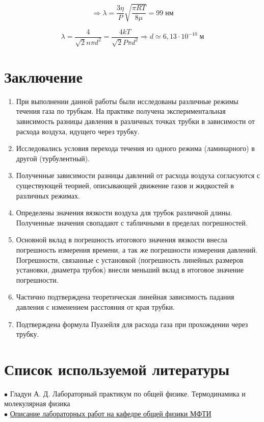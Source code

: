 \documentclass[a4paper, 12pt]{article} %
\begin{document}
\begin{equation}
    \Rightarrow \lambda = \frac{3 \eta}{P} \sqrt{\frac{\pi RT}{8 \mu}} = 99 \; \text{нм}
\end{equation}

\begin{equation}
    \lambda = \frac{4}{\sqrt{2} n \pi d^2} = \frac{4kT}{\sqrt{2} P \pi d^2} \Rightarrow d \simeq 6,13 \cdot 10^{-10} \; \text{м}
\end{equation}


\section{Заключение}

\begin{enumerate}
    \item При выполнении данной работы были исследованы различные режимы течения газа по трубкам. На практике получена экспериментальная зависимость разницы давления в различных точках трубки в зависимости от расхода воздуха, идущего через трубку.
    \item Исследовались условия перехода течения из одного режима (ламинарного) в другой (турбулентный).
    \item Полученные зависимости разницы давлений от расхода воздуха согласуются с существующей теорией, описывающей движение газов и жидкостей в различных режимах.
    \item Определены значения вязкости воздуха для трубок различной длины. Полученные значения свопадают с табличными в пределах погрешностей.
    \item Основной вклад в погрешность итогового значения вязкости внесла погрешность измерения времени, а так же погрешности измерения давлений. Погрешности, связанные с установкой (погрешность линейных размеров установки, диаметра трубок) внесли меньший вклад в итоговое значение погрешности.
    \item Частично подтверждена теоретическая линейная зависимость падания давления с изменением расстояния от края трубки.
    \item Подтверждена формула Пуазейля для расхода газа при прохождении через трубку.
\end{enumerate}

\section{Список используемой литературы}

$\bullet$ Гладун А. Д. Лабораторный практикум по общей физике. Термодинамика и молекулярная физика\\

$\bullet$ \href{https://mipt.ru/education/chair/physics/S_II/lab/}{Описание лабораторных работ на кафедре общей физики МФТИ}
\end{document}
